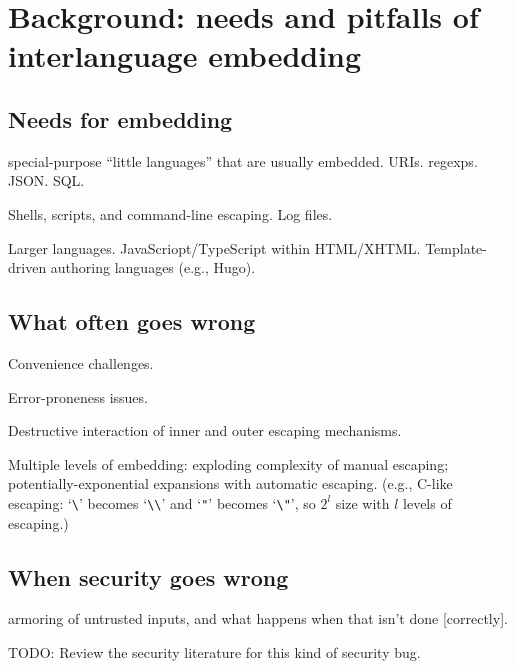 \section{Background: needs and pitfalls of interlanguage embedding}
\label{sec:bg}

\subsection{Needs for embedding}

special-purpose ``little languages'' that are usually embedded.
URIs. regexps. JSON. SQL.

Shells, scripts, and command-line escaping.
Log files.

Larger languages.  JavaScriopt/TypeScript within HTML/XHTML.
Template-driven authoring languages (e.g., Hugo).

\subsection{What often goes wrong}

Convenience challenges.

Error-proneness issues.

Destructive interaction of inner and outer escaping mechanisms.

Multiple levels of embedding: exploding complexity of manual escaping;
potentially-exponential expansions with automatic escaping.
(e.g., C-like escaping: `\verb|\|' becomes `\verb|\\|'
and `\verb|"|' becomes `\verb|\"|',
so $2^l$ size with $l$ levels of escaping.)

\subsection{When security goes wrong}

armoring of untrusted inputs,
and what happens when that isn't done [correctly].

TODO: Review the security literature for this kind of security bug.

